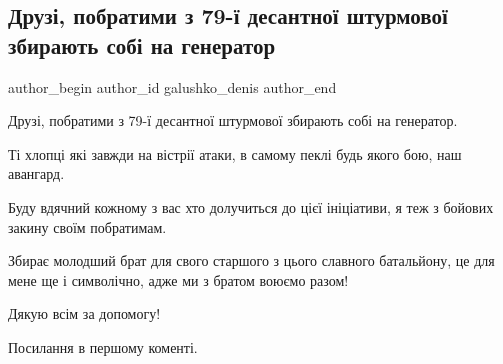  
 
 
 
 

\subsection{Друзі, побратими з 79-ї десантної штурмової збирають собі на генератор}
\label{sec:01_12_2022.fb.galushko_denis.1.druz___pobratimi_z_7}

\ifcmt
 author_begin
   author_id galushko_denis
 author_end
\fi

Друзі, побратими з 79-ї десантної штурмової збирають собі на генератор.

Ті хлопці які завжди на вістрії атаки, в самому пеклі будь якого бою, наш
авангард.

Буду вдячний кожному з вас хто долучиться до цієї ініціативи, я  теж з бойових
закину своїм побратимам.

Збирає молодший брат для свого старшого з цього славного батальйону, це для
мене ще і символічно, адже ми з братом воюємо разом!

Дякую всім за допомогу! 

Посилання в першому коменті.
